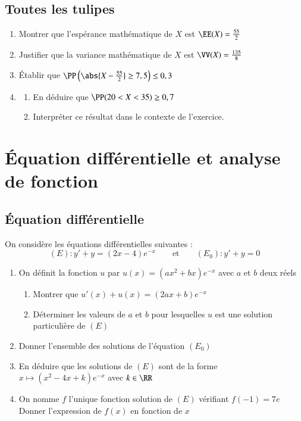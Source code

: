 \documentclass[oneside,12pt]{article}
\let\oldsection\section
\renewcommand{\section}{\newpage\oldsection}
\begin{document}
\subsection{Toutes les tulipes}
\begin{enumerate}
    \item Montrer que l'espérance mathématique de $X$ est $\EE(X)=\frac{55}{2}$
    \item Justifier que la variance mathématique de $X$ est $\VV(X)=\frac{135}{8}$
    \item Établir que $\PP\left(\abs{X-\frac{55}{2}}\geq7,5\right)\leq 0,3$
    \item \begin{enumerate}
        \item En déduire que $\PP(20<X<35)\geq0,7$
        \item Interpréter ce résultat dans le contexte de l'exercice.
    \end{enumerate}
\end{enumerate}





\section{Équation différentielle et analyse de fonction}

\subsection{Équation différentielle}
On considère les équations différentielles suivantes : 
\[(E):y'+y=(2x-4)e^{-x}\qquad \text{et} \qquad (E_0):y'+y=0\]
\begin{enumerate}
    \item On définit la fonction $u$ par $u(x)=(ax^2+bx)e^{-x}$ \quad avec $a$ et $b$ deux réels
    \begin{enumerate}
        \item Montrer que $u'(x)+u(x)=(2ax+b)e^{-x}$
        \item Déterminer les valeurs de $a$ et $b$ pour lesquelles $u$ est une solution particulière de $(E)$
    \end{enumerate}
    \item Donner l'ensemble des solutions de l'équation $(E_0)$
    \item En déduire que les solutions de $(E)$ sont de la forme $x\mapsto (x^2-4x+k)e^{-x}$ \quad avec $k\in\RR$
    \item On nomme $f$ l'unique fonction solution de $(E)$ vérifiant $f(-1)=7e$\\
    Donner l'expression de $f(x)$ en fonction de $x$
\end{enumerate}
\end{document}

